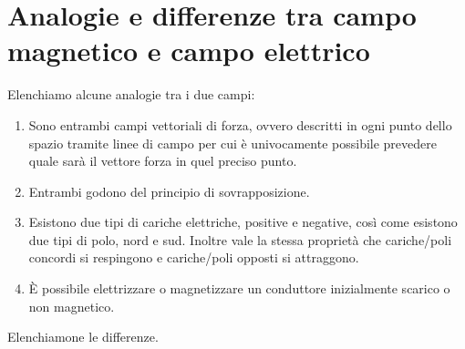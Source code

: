\documentclass[12pt]{report}
\begin{document}
\section{Analogie e differenze tra campo magnetico e campo elettrico}
Elenchiamo alcune analogie tra i due campi:
\begin{enumerate}
	\item Sono entrambi campi vettoriali di forza, ovvero descritti in ogni punto dello spazio tramite linee di campo per cui è univocamente possibile prevedere quale sarà il vettore forza in quel preciso punto.
	\item Entrambi godono del principio di sovrapposizione.
	\item Esistono due tipi di cariche elettriche, positive e negative, così come esistono due tipi di polo, nord e sud. Inoltre vale la stessa proprietà che cariche/poli concordi si respingono e cariche/poli opposti si attraggono.
	\item È possibile elettrizzare o magnetizzare un conduttore inizialmente scarico o non magnetico.
\end{enumerate}
Elenchiamone le differenze.
\end{document}
